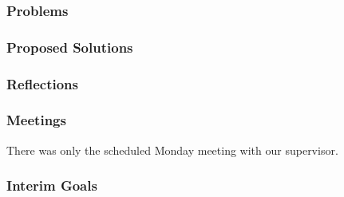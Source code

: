 \subsubsection{Problems}


\subsubsection{Proposed Solutions}


\subsubsection{Reflections}


\subsubsection{Meetings}

There was only the scheduled Monday meeting with our supervisor.

\subsubsection{Interim Goals}


